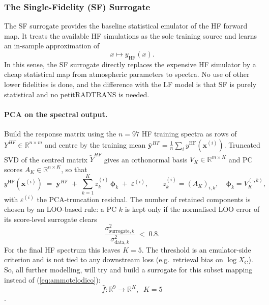 \documentclass[11pt,a4paper]{article}
\newcommand{\thref}[1]{{\color{teal}\textit{Thesis: #1}}}
\newcommand{\litref}[1]{{\color{violet}\textit{See: #1}}}
\newcommand{\xv}{\bm{x}}
\newcommand{\yv}{\bm{y}}
\newcommand{\XC}{\log X_{\mathrm{C}}}
\newcommand{\yhf}{y^{\mathrm{HF}}}
\begin{document}

\subsubsection{The Single-Fidelity (SF) Surrogate}

The SF surrogate provides the baseline statistical emulator of the HF forward map.
It treats the available HF simulations as the sole training source and learns an in-sample approximation of
\[
x \longmapsto y_{\mathrm{HF}}(x).
\]
In this sense, the SF surrogate directly replaces the expensive HF simulator by a
cheap statistical map from atmospheric parameters to spectra. No use of other lower fidelities is done, and the difference with the LF model is that SF is purely statistical and no petitRADTRANS is needed.

\paragraph{PCA on the spectral output.}
Build the response matrix using the $n=97$ HF training spectra as rows of
$Y^{HF}\in\mathbb{R}^{n\times m}$ and centre by the training mean
$\bar{\yv}^{HF} = \tfrac{1}{n}\sum_{i}\yhf(\xv^{(i)})$. Truncated SVD
of the centred matrix $\tilde Y^{HF}$ gives an orthonormal basis
$V_{K} \in \mathbb{R}^{m\times K}$ and PC scores
$A_{K}\in\mathbb{R}^{n\times K}$, so that
\[
\yhf(\xv^{(i)}) \;=\; \bar{\yv}^{HF}
\;+\; \sum_{k=1}^{K} z_{k}^{(i)}\,\bm{\phi}_{k}
\;+\; \varepsilon^{(i)},
\qquad z_{k}^{(i)} = (A_{K})_{i,k},\quad
\bm{\phi}_{k} = V_{K}^{(\cdot,k)},
\]
with $\varepsilon^{(i)}$ the PCA-truncation residual. The number of
retained components is chosen by an LOO-based rule: a PC $k$ is kept
only if the normalised LOO error of its score-level surrogate clears
\[
\frac{\sigma^{2}_{\mathrm{surrogate},k}}
     {\sigma^{2}_{\mathrm{data},k}} \;<\; 0.8 .
\]
For the final HF spectrum this leaves $K = 5$. The threshold is an
emulator-side criterion and is not tied to any downstream loss
(e.g.\ retrieval bias on $\XC$).
So, all further modelling, will try and build a surrogate for this subset mapping instead of (\ref{eq:ammotelodico}):
\[
\hat{f}:\mathbb{R}^9\longrightarrow\mathbb{R}^{K},\;\; K=5
\].


\end{document}
